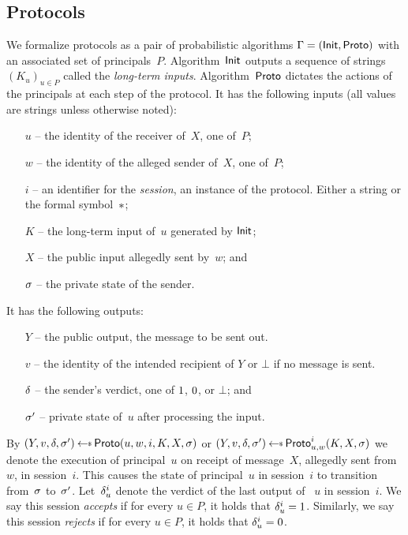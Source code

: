 \subsection{Protocols}
We formalize protocols as a pair of probabilistic algorithms $\mathrm{\Gamma} =
(\mathsf{Init}, \mathsf{Proto})$ with an associated set of principals~$P$.
%
Algorithm~$\mathsf{Init}$ outputs a sequence of strings $(K_u)_{u\in P}$ called the
\emph{long-term inputs}.
%
Algorithm~$\mathsf{Proto}$ dictates the actions of the principals at each step
of the protocol. It has the following inputs (all values are strings unless
otherwise noted):
\begin{itemize}
  \item[$u$] -- the identity of the receiver of~$X$, one of~$P$;
  \item[$w$] -- the identity of the alleged sender of~$X$, one of~$P$;
  \item[$i$] -- an identifier for the \emph{session}, an instance of the
    protocol. Either a string or the formal symbol~$*$;
  \item[$K$] -- the long-term input of~$u$ generated by $\mathsf{Init}$;
  \item[$X$] -- the public input allegedly sent by~$w$; and
  \item[$\sigma$] -- the private state of the sender.
\end{itemize}
It has the following outputs:
\begin{itemize}
  \item[$Y$] -- the public output, the message to be sent out.
  \item[$v$] -- the identity of the intended recipient of $Y$ or $\bot$ if no
    message is sent.
  \item[$\delta$] -- the sender's verdict, one of $1$, $0$, or
    $\bot$; and
  \item[$\sigma^\prime$] -- private state of~$u$ after processing the
    input.
\end{itemize}
By $(Y, v, \verdict, \st^\prime) \getsr \proto(u, w, i, K, X, \st)$ or
$(Y, v, \verdict, \st^\prime) \getsr \proto_{u,w}^i(K, X, \st)$ we denote the
execution of principal~$u$ on receipt of message~$X$, allegedly sent from~$w$,
in session~$i$. This causes the state of principal~$u$ in session~$i$ to
transition from~$\sigma$ to~$\sigma^\prime$.
%
Let~$\delta_u^{i}$ denote the verdict of the last output of ~$u$ in
session~$i$. We say this session \emph{accepts} if for every $u \in P$, it holds
that $\delta_u^{i} = 1$.  Similarly, we say this session \emph{rejects}
if for every $u \in P$, it holds that $\delta_u^{i} = 0$.

